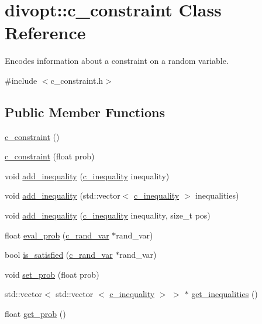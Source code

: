 \hypertarget{classdivopt_1_1c__constraint}{\section{divopt\-:\-:c\-\_\-constraint \-Class \-Reference}
\label{classdivopt_1_1c__constraint}
}


\-Encodes information about a constraint on a random variable.  




{\ttfamily \#include $<$c\-\_\-constraint.\-h$>$}

\subsection*{\-Public \-Member \-Functions}
\begin{DoxyCompactItemize}
\item 
\hyperlink{classdivopt_1_1c__constraint_af7708cbcea2a4c3a9c75f9cae4aa86c9}{c\-\_\-constraint} ()
\item 
\hyperlink{classdivopt_1_1c__constraint_a51f6d7e631c0fc45fa07954fa3f03b6e}{c\-\_\-constraint} (float prob)
\item 
void \hyperlink{classdivopt_1_1c__constraint_a263411cb48b03426e79f0a510f754cba}{add\-\_\-inequality} (\hyperlink{classdivopt_1_1c__inequality}{c\-\_\-inequality} inequality)
\item 
void \hyperlink{classdivopt_1_1c__constraint_a0c1a0b70ce9e8474fafb837175019976}{add\-\_\-inequality} (std\-::vector$<$ \hyperlink{classdivopt_1_1c__inequality}{c\-\_\-inequality} $>$ inequalities)
\item 
void \hyperlink{classdivopt_1_1c__constraint_a97bc8c242ec55f0990604ef268c5216d}{add\-\_\-inequality} (\hyperlink{classdivopt_1_1c__inequality}{c\-\_\-inequality} inequality, size\-\_\-t pos)
\item 
float \hyperlink{classdivopt_1_1c__constraint_a615ea0956d9c28712f8eeeaecb29e0d9}{eval\-\_\-prob} (\hyperlink{classdivopt_1_1c__rand__var}{c\-\_\-rand\-\_\-var} $\ast$rand\-\_\-var)
\item 
bool \hyperlink{classdivopt_1_1c__constraint_ae07db5dcb26bdedc94768c62b7c403d8}{is\-\_\-satisfied} (\hyperlink{classdivopt_1_1c__rand__var}{c\-\_\-rand\-\_\-var} $\ast$rand\-\_\-var)
\item 
void \hyperlink{classdivopt_1_1c__constraint_a4eab366ff54ab0397a5a50cf70a312f4}{set\-\_\-prob} (float prob)
\item 
std\-::vector$<$ std\-::vector\*
$<$ \hyperlink{classdivopt_1_1c__inequality}{c\-\_\-inequality} $>$ $>$ $\ast$ \hyperlink{classdivopt_1_1c__constraint_a115deba8a25f3bcd8d799e930db969c4}{get\-\_\-inequalities} ()
\item 
float \hyperlink{classdivopt_1_1c__constraint_a8d49fcb40dfdd2f99c90b36840a77d16}{get\-\_\-prob} ()
\end{DoxyCompactItemize}
